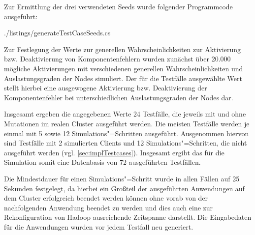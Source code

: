 Zur Ermittlung der drei verwendeten Seeds wurde folgender Programmcode ausgeführt:


{./listings/generateTestCaseSeeds.cs}

Zur Festlegung der Werte zur generellen Wahrscheinlichkeiten zur Aktivierung bzw. Deaktivierung von Komponentenfehlern wurden zunächst über 20.000 mögliche Aktivierungen mit verschiedenen generellen Wahrscheinlichkeiten und Auslastungsgraden der Nodes simuliert.
Der für die Testfälle ausgewählte Wert stellt hierbei eine ausgewogene Aktivierung bzw. Deaktivierung der Komponentenfehler bei unterschiedlichen Auslastungsgraden der Nodes dar.

Insgesamt ergeben die angegebenen Werte 24 Testfälle, die jeweils mit und ohne Mutationen im realen Cluster ausgeführt werden.
Die meisten Testfälle werden je einmal mit 5 sowie 12 Simulations"=Schritten ausgeführt.
Ausgenommen hiervon sind Testfälle mit 2 simulierten Clients und 12 Simulations"=Schritten, die nicht ausgeführt werden (vgl. \autoref{sec:implTestcases}).
Insgesamt ergibt das für die Simulation somit eine Datenbasis von 72 ausgeführten Testfällen.

Die Mindestdauer für einen Simulations"=Schritt wurde in allen Fällen auf 25 Sekunden festgelegt, da hierbei ein Großteil der ausgeführten Anwendungen auf dem Cluster erfolgreich beendet werden können ohne vorab von der nachfolgenden Anwendung beendet zu werden und dies auch eine zur Rekonfiguration von Hadoop ausreichende Zeitspanne darstellt.
Die Eingabedaten für die Anwendungen wurden vor jedem Testfall neu generiert.
